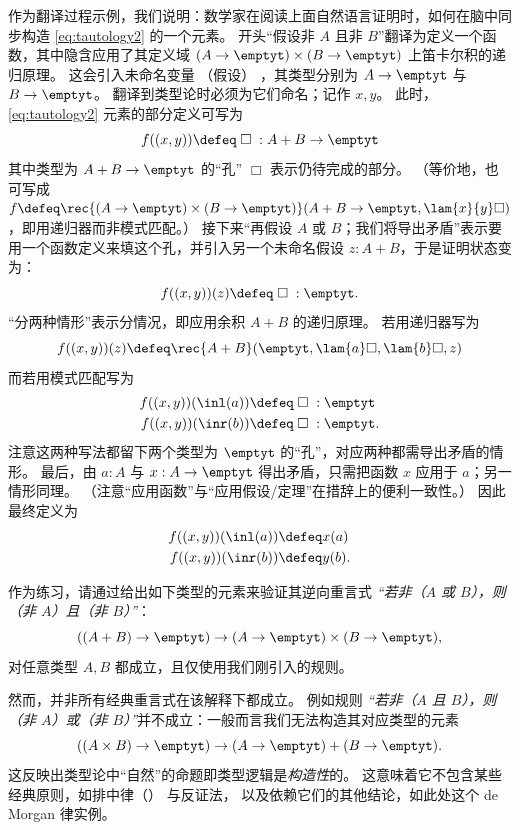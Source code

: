 作为翻译过程示例，我们说明：数学家在阅读上面自然语言证明时，如何在脑中同步构造 \eqref{eq:tautology2} 的一个元素。
开头“假设非 $A$ 且非 $B$”翻译为定义一个函数，其中隐含应用了其定义域 $(A\to\emptyt)\times (B\to\emptyt)$ 上笛卡尔积的递归原理。
这会引入未命名变量
%
（假设）
%
，其类型分别为 $A\to\emptyt$ 与 $B\to\emptyt$。
翻译到类型论时必须为它们命名；记作 $x,y$。
此时，\eqref{eq:tautology2} 元素的部分定义可写为
\[ f((x,y)) \defeq\; \Box\;:A+B\to\emptyt \]
其中类型为 $A+B\to\emptyt$ 的“孔” $\Box$ 表示仍待完成的部分。
（等价地，也可写成 $f \defeq \rec{(A\to\emptyt)\times (B\to\emptyt)}(A+B\to\emptyt,\lam{x}{y} \Box)$，即用递归器而非模式匹配。）
接下来“再假设 $A$ 或 $B$；我们将导出矛盾”表示要用一个函数定义来填这个孔，并引入另一个未命名假设 $z:A+B$，于是证明状态变为：
\[ f((x,y))(z) \defeq \;\Box\; :\emptyt. \]
“分两种情形”表示分情况，即应用余积 $A+B$ 的递归原理。
若用递归器写为
\[ f((x,y))(z) \defeq \rec{A+B}(\emptyt,\lam{a} \Box,\lam{b}\Box,z) \]
而若用模式匹配写为
\begin{align*}
  f((x,y))(\inl(a)) &\defeq \;\Box\;:\emptyt\\
  f((x,y))(\inr(b)) &\defeq \;\Box\;:\emptyt.
\end{align*}
注意这两种写法都留下两个类型为 $\emptyt$ 的“孔”，对应两种都需导出矛盾的情形。
最后，由 $a:A$ 与 $x:A\to\emptyt$ 得出矛盾，只需把函数 $x$ 应用于 $a$；另一情形同理。
%
（注意“应用函数”与“应用假设/定理”在措辞上的便利一致性。）
因此最终定义为
\begin{align*}
  f((x,y))(\inl(a)) &\defeq x(a)\\
  f((x,y))(\inr(b)) &\defeq y(b).
\end{align*}

作为练习，请通过给出如下类型的元素来验证其逆向重言式
\emph{“若非（$A$ 或 $B$），则（非 $A$）且（非 $B$）”}：
\[ ((A + B) \to \emptyt) \to (A \to \emptyt) \times (B \to \emptyt), \]
对任意类型 $A,B$ 都成立，且仅使用我们刚引入的规则。

然而，并非所有经典重言式在该解释下都成立。
例如规则
\emph{“若非（$A$ 且 $B$），则（非 $A$）或（非 $B$）”}并不成立：一般而言我们无法构造其对应类型的元素
\[ ((A \times B) \to \emptyt) \to (A \to \emptyt) + (B \to \emptyt).\]
这反映出类型论中“自然”的命题即类型逻辑是\emph{构造性}的。
这意味着它不包含某些经典原则，如排中律（\LEM{}）
与反证法，
以及依赖它们的其他结论，如此处这个 de Morgan 律实例。
%
%

